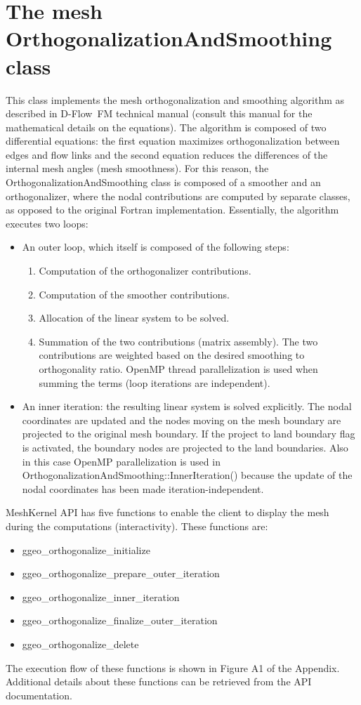 \documentclass[biblatex]{deltares_manual}
\newcommand{\dflowfm}{D-Flow~FM\xspace}
\begin{document}
\chapter{The mesh OrthogonalizationAndSmoothing class}

This class implements the mesh orthogonalization and smoothing algorithm as described in \dflowfm technical manual (consult this manual for the mathematical details on the equations). The algorithm is composed of two differential equations: the first equation maximizes orthogonalization between edges and flow links and the second equation reduces the differences of the internal mesh angles (mesh smoothness). For this reason, the OrthogonalizationAndSmoothing class is composed of a smoother and an orthogonalizer, where the nodal contributions are computed by separate classes, as opposed to the original Fortran implementation. Essentially, the algorithm executes two loops:
\begin{itemize}
\item An outer loop, which itself is composed of the following steps:
\begin{enumerate}
\item Computation of the orthogonalizer contributions.
\item Computation of the smoother contributions.
\item Allocation of the linear system to be solved.
\item Summation of the two contributions (matrix assembly).
The two contributions are weighted based on the desired smoothing to orthogonality ratio. OpenMP thread parallelization is used when summing the terms (loop iterations are independent).
\end{enumerate}
\item An inner iteration: the resulting linear system is solved explicitly. The nodal coordinates are updated and the nodes moving on the mesh boundary are projected to the original mesh boundary. If the project to land boundary flag is activated, the boundary nodes are projected to the land boundaries. Also in this case OpenMP parallelization is used in OrthogonalizationAndSmoothing::InnerIteration() because the update of the nodal coordinates has been made iteration-independent.
\end{itemize}
MeshKernel API has five functions to enable the client to display the mesh during the computations (interactivity). These functions are:
\begin{itemize}
\item ggeo\_orthogonalize\_initialize
\item ggeo\_orthogonalize\_prepare\_outer\_iteration
\item ggeo\_orthogonalize\_inner\_iteration
\item ggeo\_orthogonalize\_finalize\_outer\_iteration
\item ggeo\_orthogonalize\_delete
\end{itemize}
The execution flow of these functions is shown in Figure A1 of the Appendix. Additional details about these functions can be retrieved from the API documentation.
\end{document}
